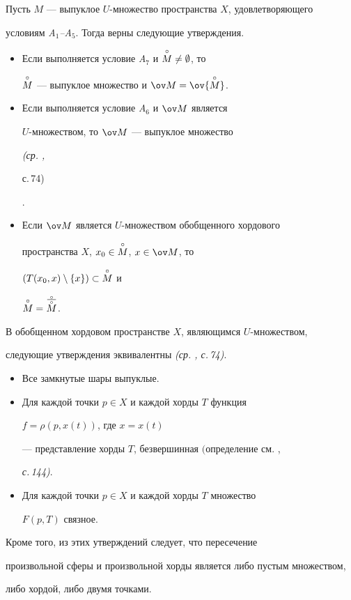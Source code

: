  


\begin{thm} 


Пусть $M$ --- выпуклое $U$-множество пространства $X$, удовлетворяющего 


условиям {\em A${}_1$--A${}_5$}. Тогда верны следующие утверждения. 


\begin{itemize} 


\item[A.] Если выполняется условие {\em A${}_7$} и $\overset{\circ}{M}{}\ne\emptyset$, то 


$\overset{\circ}{M}{}$ --- выпуклое множество и $\ov M=\ov{\cM}$. 


\item[B.] Если выполняется условие {\em A${}_6$} и $\ov M$ является 


$U$-множеством, то $\ov M$ --- выпуклое множество {\em (ср. \cite{1}, 


с.\,74)}. 


\item[C.] Если $\ov M$ является $U$-множеством обобщенного хордового 


пространства $X$, $x_0\in\overset{\circ}{M}{}$, $x\in\ov M$, то 


$(T(x_0,x)\setminus\{x\})\subset\overset{\circ}{M}{}$ и 


$\overset{\circ}{M}{}=\overset{\frac{\phantom{i}\circ\phantom{i}}{\circ}}{M}$. 


\end{itemize} 


\end{thm} 


 


\begin{thm} 


В обобщенном хордовом пространстве $X$, являющимся $U$-множеством, 


следующие утверждения эквивалентны {\em (ср. \cite{1}, с.\,74)}. 


\begin{itemize} 


\item[A.]  Все замкнутые шары выпуклые. 


\item[B.] Для каждой точки $p\in X$ и каждой хорды $T$ функция 


$f=\rho(p,x(t))$, где $x=x(t)$ 


--- представление хорды $T$, безвершинная $($определение см. \cite{2}, 


{\em с.\,144)}. 


\item[C.] Для каждой точки $p\in X$ и каждой хорды $T$ множество 


$F(p,T)$ связное. 


\end{itemize} 


Кроме того, из этих утверждений следует, что пересечение 


произвольной сферы и произвольной хорды является либо пустым множеством, 


либо хордой, либо двумя точками. 


\end{thm} 


